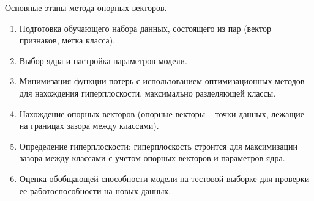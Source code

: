 Основные этапы метода опорных векторов.
\begin{enumerate}
	\item Подготовка обучающего набора данных, состоящего из пар (вектор признаков, метка класса).
	\item Выбор ядра и настройка параметров модели.
	\item Минимизация функции потерь с использованием оптимизационных методов для нахождения гиперплоскости, максимально разделяющей классы.
	\item Нахождение опорных векторов (опорные векторы -- точки данных, лежащие на границах зазора между классами).
	\item Определение гиперплоскости: гиперплоскость строится для максимизации зазора между классами с учетом опорных векторов и параметров ядра.
	\item Оценка обобщающей способности модели на тестовой выборке для проверки ее работоспособности на новых данных.
\end{enumerate}
